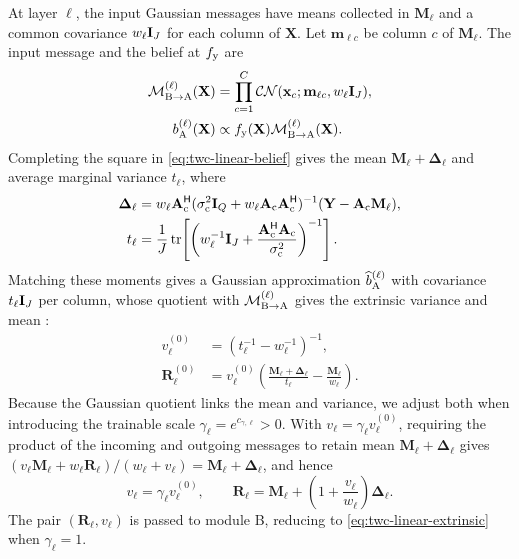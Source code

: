 At layer $\ell$, the input Gaussian messages have means collected in
$\mathbf M_\ell$ and a common covariance $w_\ell\mathbf{I}_J$ for each
column of $\mathbf X$. Let $\mathbf m_{\ell c}$ be column $c$ of
$\mathbf M_\ell$. The input message and the belief at $f_{\rm y}$
are
\begin{equation}
 \begin{aligned}
 \mathcal M_{\rm B\to A}^{(\ell)}(\mathbf X)
 &=\prod_{c=1}^{C}\mathcal{CN}(\mathbf x_c;
                  \mathbf m_{\ell c},w_\ell\mathbf{I}_J),\\
 b_{\rm A}^{(\ell)}(\mathbf X)
 &\propto f_{\rm y}(\mathbf X)
             \mathcal M_{\rm B\to A}^{(\ell)}(\mathbf X).
 \end{aligned}
 \label{eq:twc-linear-belief}
\end{equation}
Completing the square in \eqref{eq:twc-linear-belief} gives the mean
$\mathbf M_\ell+\bm\Delta_\ell$ and average marginal variance
$t_\ell$, where
\begin{equation}
 \begin{aligned}
 \bm\Delta_\ell&=w_\ell\mathbf A_{\rm c}^{\mathsf H}
 (\sigma_{\rm c}^2\mathbf{I}_Q+w_\ell\mathbf A_{\rm c}\mathbf A_{\rm c}^{\mathsf H})^{-1}
 (\mathbf Y-\mathbf A_{\rm c}\mathbf M_\ell),
 \\
 t_\ell&=\frac1J\operatorname{tr}\!\left[
 \left(w_\ell^{-1}\mathbf{I}_J+
 \frac{\mathbf A_{\rm c}^{\mathsf H}\mathbf A_{\rm c}}{\sigma_{\rm c}^2}
 \right)^{-1}\right].
 \end{aligned}
 \label{eq:twc-linear-correction}
\end{equation}
Matching these moments gives a Gaussian approximation
$\widehat b_{\rm A}^{(\ell)}$ with covariance $t_\ell\mathbf{I}_J$ per
column, whose quotient with $\mathcal M_{\rm B\to A}^{(\ell)}$
gives the extrinsic variance and mean \cite{minka2001,cai2026}:
\begin{equation}
 \begin{aligned}
 v_\ell^{(0)}&=(t_\ell^{-1}-w_\ell^{-1})^{-1},\\
 \mathbf R_\ell^{(0)}&=v_\ell^{(0)}
 \left(\frac{\mathbf M_\ell+\bm\Delta_\ell}{t_\ell}
       -\frac{\mathbf M_\ell}{w_\ell}\right).
 \end{aligned}
 \label{eq:twc-linear-extrinsic}
\end{equation}
Because the Gaussian quotient links the mean and variance, we adjust
both when introducing the trainable scale
$\gamma_\ell=e^{c_{\gamma,\ell}}>0$. With
$v_\ell=\gamma_\ell v_\ell^{(0)}$, requiring the product of the
incoming and outgoing messages to retain mean
$\mathbf M_\ell+\bm\Delta_\ell$ gives
$(v_\ell\mathbf M_\ell+w_\ell\mathbf R_\ell)/(w_\ell+v_\ell)
=\mathbf M_\ell+\bm\Delta_\ell$, and hence
\begin{equation}
 v_\ell=\gamma_\ell v_\ell^{(0)},\qquad
 \mathbf R_\ell=\mathbf M_\ell+
 \left(1+\frac{v_\ell}{w_\ell}\right)\bm\Delta_\ell.
 \label{eq:twc-query-calibrated}
\end{equation}
The pair $(\mathbf R_\ell,v_\ell)$ is passed to module B, reducing
to \eqref{eq:twc-linear-extrinsic} when $\gamma_\ell=1$.

